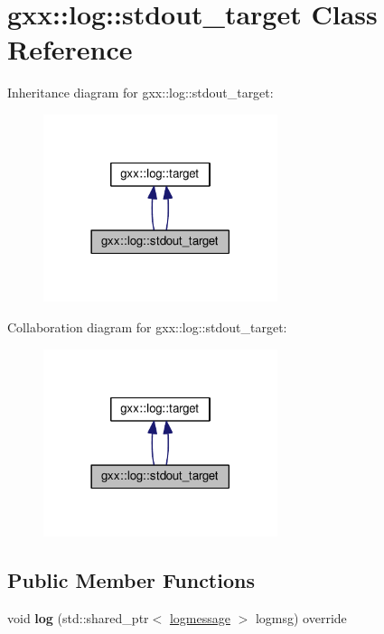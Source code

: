 \hypertarget{structgxx_1_1log_1_1stdout__target}{}\section{gxx\+:\+:log\+:\+:stdout\+\_\+target Class Reference}
\label{structgxx_1_1log_1_1stdout__target}


Inheritance diagram for gxx\+:\+:log\+:\+:stdout\+\_\+target\+:
\nopagebreak
\begin{figure}[H]
\begin{center}
\leavevmode
\includegraphics[width=194pt]{structgxx_1_1log_1_1stdout__target__inherit__graph}
\end{center}
\end{figure}


Collaboration diagram for gxx\+:\+:log\+:\+:stdout\+\_\+target\+:
\nopagebreak
\begin{figure}[H]
\begin{center}
\leavevmode
\includegraphics[width=194pt]{structgxx_1_1log_1_1stdout__target__coll__graph}
\end{center}
\end{figure}
\subsection*{Public Member Functions}
\begin{DoxyCompactItemize}
\item 
void {\bfseries log} (std\+::shared\+\_\+ptr$<$ \hyperlink{structgxx_1_1log_1_1logmessage}{logmessage} $>$ logmsg) override\hypertarget{structgxx_1_1log_1_1stdout__target_a3d8162419a9c551c2813cd37dc8a0a4b}{}\label{structgxx_1_1log_1_1stdout__target_a3d8162419a9c551c2813cd37dc8a0a4b}

\end{DoxyCompactItemize}
